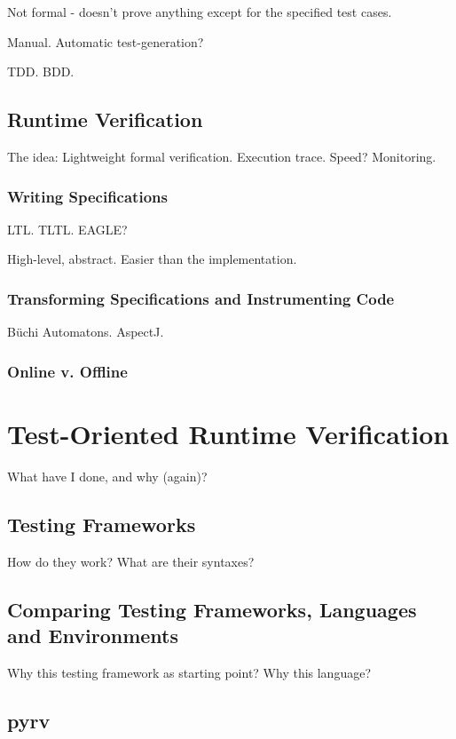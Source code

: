 \documentclass[a4paper,11pt]{kth-mag}
\begin{document}
Not formal - doesn't prove anything except for the specified test cases.

Manual. Automatic test-generation?

TDD. BDD.

\section{Runtime Verification}

The idea: Lightweight formal verification. Execution trace. Speed? Monitoring.

\subsection{Writing Specifications}

LTL. TLTL. EAGLE?

High-level, abstract. Easier than the implementation.

\subsection{Transforming Specifications and Instrumenting Code}

B\"uchi Automatons.
AspectJ.

\subsection{Online v. Offline}

\pagestyle{newchap}
\chapter{Test-Oriented Runtime Verification}

What have I done, and why (again)?

\section{Testing Frameworks}

How do they work? What are their syntaxes?

\section{Comparing Testing Frameworks, Languages and Environments}

Why this testing framework as starting point? Why this language?

\section{pyrv}
\end{document}
